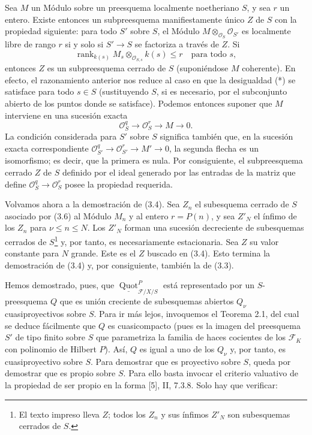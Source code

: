  Sea $M$ un Módulo sobre un preesquema localmente
noetheriano $S$, y sea $r$ un entero. Existe entonces un subpreesquema
manifiestamente único $Z$ de $S$ con la propiedad siguiente: para todo $S'$
sobre $S$, el Módulo $M\otimes_{\mathcal O_S}\mathcal O_{S'}$ es localmente
libre de rango $r$ si y solo si $S'\longrightarrow S$ se factoriza a través de
$Z$. Si
\[
\operatorname{rank}_{k(s)}
M_s\otimes_{\mathcal O_{S,s}}k(s)\leq r
\quad\text{para todo $s$},
\]
entonces $Z$ es un subpreesquema cerrado de $S$ (suponiéndose $M$ coherente).
En efecto, el razonamiento anterior nos reduce al caso en que la desigualdad
(*) se satisface para todo $s\in S$ (sustituyendo $S$, si es necesario, por el
subconjunto abierto de los puntos donde se satisface). Podemos entonces suponer
que $M$ interviene en una sucesión exacta
\[
\mathcal O_S^q\longrightarrow\mathcal O_S^r\longrightarrow M\longrightarrow0.
\]
La condición considerada para $S'$ sobre $S$ significa también que, en la
sucesión exacta correspondiente
$\mathcal O_{S'}^q\longrightarrow\mathcal O_{S'}^r
\longrightarrow M'\longrightarrow0$, la segunda flecha es un isomorfismo; es
decir, que la primera es nula. Por consiguiente, el subpreesquema cerrado $Z$
de $S$ definido por el ideal generado por las entradas de la matriz que define
$\mathcal O_S^q\longrightarrow\mathcal O_S^r$ posee la propiedad requerida.

Volvamos ahora a la demostración de (3.4). Sea $Z_n$ el subesquema cerrado de
$S$ asociado por (3.6) al Módulo $M_n$ y al entero $r=P(n)$, y sea $Z'_N$ el
ínfimo de los $Z_n$ para $\nu\leq n\leq N$. Los $Z'_N$ forman una sucesión
decreciente de subesquemas cerrados de $S$\footnote{El texto impreso lleva $Z$; todos los $Z_n$ y sus ínfimos $Z'_N$ son subesquemas cerrados de $S$.} y, por tanto, es necesariamente
estacionaria. Sea $Z$ su valor constante para $N$ grande. Este es el $Z$
buscado en (3.4). Esto termina la demostración de (3.4) y, por consiguiente,
también la de (3.3).

Hemos demostrado, pues, que
$\underline{\operatorname{Quot}}^P_{\mathcal F/X/S}$ está representado por un
$S$-preesquema $Q$ que es unión creciente de subesquemas abiertos $Q_\nu$
cuasiproyectivos sobre $S$. Para ir más lejos, invoquemos el Teorema 2.1, del
cual se deduce fácilmente que $Q$ es cuasicompacto (pues es la imagen del
preesquema $S'$ de tipo finito sobre $S$ que parametriza la familia de haces
cocientes de los $\mathcal F_K$ con polinomio de Hilbert $P$). Así, $Q$ es
igual a uno de los $Q_\nu$ y, por tanto, es cuasiproyectivo sobre $S$. Para
demostrar que es proyectivo sobre $S$, queda por demostrar que es propio sobre
$S$. Para ello basta invocar el criterio valuativo de la propiedad de ser
propio en la forma
[5], II, 7.3.8. Solo hay que verificar:

